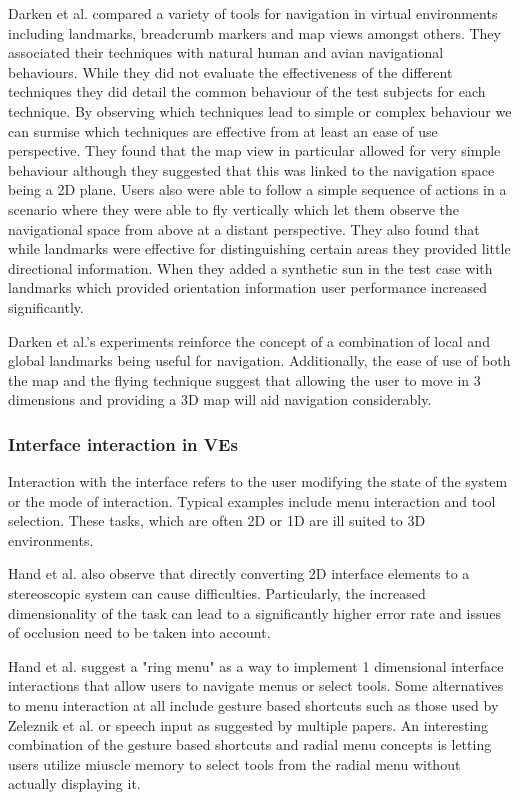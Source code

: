 \documentclass{sig-alternate-05-2015}
\begin{document}
Darken et al. compared a variety of tools for navigation in virtual environments including landmarks, breadcrumb markers and map views amongst others\cite{Darken1993}. They associated their techniques with natural human and avian  navigational behaviours. While they did not evaluate the effectiveness of the different techniques they did detail the common behaviour of the test subjects for each technique. By observing which techniques lead to simple or complex behaviour we can surmise which techniques are effective from at least an ease of use perspective. They found that the map view in particular allowed for very simple behaviour although they suggested that this was linked to the navigation space being a 2D plane. Users also were able to follow a simple sequence of actions in a scenario where they were able to fly vertically which let them observe the navigational space from above at a distant perspective. They also found that while landmarks were effective for distinguishing certain areas they provided little directional information. When they added a synthetic sun in the test case with landmarks which provided orientation information user performance increased significantly.

Darken et al.'s experiments reinforce the concept of a combination of local and global landmarks being useful for navigation.\cite{Darken1993} Additionally, the ease of use of both the map and the flying technique suggest that allowing the user to move in 3 dimensions and providing a 3D map will aid navigation considerably. 
\subsubsection{Interface interaction in VEs}
 Interaction with the interface refers to the user modifying the state of the system or the mode of interaction\cite{Bowman2001}. Typical examples include menu interaction and tool selection. These tasks, which are often 2D or 1D are ill suited to 3D environments\cite{Bowman2001, Hand1997}.
 
 Hand et al. also observe that directly converting 2D interface elements to a stereoscopic system can cause difficulties.\cite{Hand1997} Particularly, the increased dimensionality of the task can lead to a significantly higher error rate and issues of occlusion need to be taken into account.
 
 Hand et al. suggest a "ring menu" as a way to implement 1 dimensional interface interactions that allow users to navigate menus or select tools.\cite{Hand1997} Some alternatives to menu interaction at all include gesture based shortcuts such as those used by Zeleznik et al.\cite{Zeleznik2007} or speech input as suggested by multiple papers. \cite{VanDam1997,Bowman2001,Hand1997} An interesting combination of the gesture based shortcuts and radial menu concepts is letting users utilize miuscle memory to select tools from the radial menu without actually displaying it.\cite{Kurtenbach1993}
 
\end{document}

